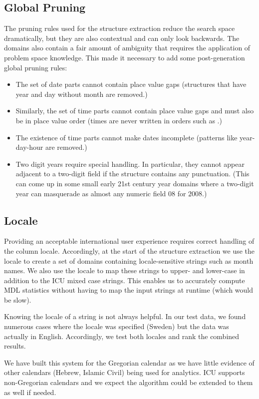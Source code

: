 \subsection{Global Pruning}
The pruning rules used for the structure extraction reduce the search space dramatically, but they are also contextual and can only look backwards. 
The domains also contain a fair amount of ambiguity that requires the application of problem space knowledge. 
This made it necessary to add some post-generation global pruning rules:
\begin{itemize}
\setlength\itemsep{0em}
\item The set of date parts cannot contain place value gaps (\eg structures that have year and day without month are removed.)
\item Similarly, the set of time parts cannot contain place value gaps and must also be in place value order (times are never written in orders such as .)
\item The existence of time parts cannot make dates incomplete (\eg patterns like year-day-hour are removed.)
\item Two digit years require special handling. In particular, they cannot appear adjacent to a two-digit field if the structure contains any punctuation. (This can come up in some small early 21st century year domains where a two-digit year can masquerade as almost any numeric field \eg $08$ for $2008$.)
\end{itemize}


\subsection{Locale}
Providing an acceptable international user experience requires correct handling of the column locale. 
Accordingly, at the start of the structure extraction we use the locale to create a set of domains containing locale-sensitive strings such as month names. We also use the locale to map these strings to upper- and lower-case in addition to the ICU mixed case strings. 
This enables us to accurately compute MDL statistics without having to map the input strings at runtime (which would be slow).

Knowing the locale of a string is not always helpful. In our test data, we found numerous cases where the locale was specified (\eg Sweden) but the data was actually in English. Accordingly, we test both locales and rank the combined results. 

We have built this system for the Gregorian calendar as we have little evidence of other calendars (\eg Hebrew, Islamic Civil) being used for analytics. 
ICU supports non-Gregorian calendars and we expect the algorithm could be extended to them as well if needed.

